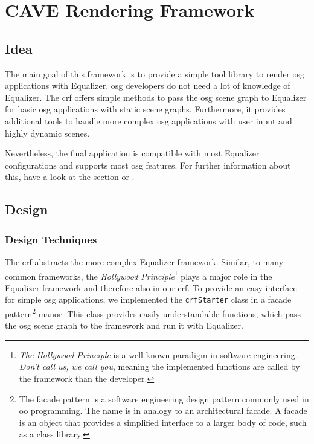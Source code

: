 \chapter{CAVE Rendering Framework}

\section{Idea}

The main goal of this framework is to provide a simple tool library to render \gls{osg} applications with Equalizer. \gls{osg} developers do not need a lot of knowledge of Equalizer. The \gls{crf} offers simple methods to pass the \gls{osg} scene graph to Equalizer for basic \gls{osg} applications with static scene graphs. Furthermore, it provides additional tools to handle more complex \gls{osg} applications with user input and highly dynamic scenes.

Nevertheless, the final application is compatible with most Equalizer configurations and supports most \gls{osg} features. For further information about this, have a look at the section  or .

\section{Design}
\subsection{Design Techniques}
The \gls{crf} abstracts the more complex Equalizer framework. Similar, to many common frameworks, the \emph{Hollywood Principle}\footnote{\emph{The Hollywood Principle} is a well known paradigm in software engineering. \emph{Don't call us, we call you}, meaning the implemented functions are called by the framework than the developer.} plays a major role in the Equalizer framework and therefore also in our \gls{crf}. To provide an easy interface for simple \gls{osg} applications, we implemented the \texttt{crfStarter} class in a facade pattern\footnote{The facade pattern is a software engineering design pattern commonly used in \gls{oo} programming. The name is in analogy to an architectural facade. A facade is an object that provides a simplified interface to a larger body of code, such as a class library.} manor. This class provides easily understandable functions, which pass the \gls{osg} scene graph to the framework and run it with Equalizer.

